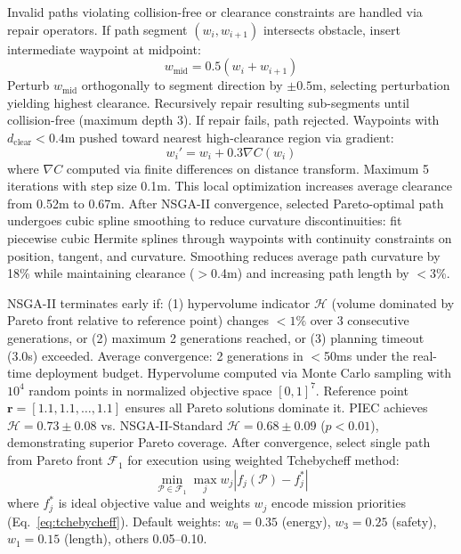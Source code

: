 \documentclass[pdflatex,sn-nature]{sn-jnl}%
\begin{document}
Invalid paths violating collision-free or clearance constraints are handled via repair operators. If path segment $(w_i, w_{i+1})$ intersects obstacle, insert intermediate waypoint at midpoint:
\begin{equation}
w_{\text{mid}} = 0.5(w_i + w_{i+1})
\label{eq:midpoint_repair}
\end{equation}
Perturb $w_{\text{mid}}$ orthogonally to segment direction by $\pm 0.5$m, selecting perturbation yielding highest clearance. Recursively repair resulting sub-segments until collision-free (maximum depth 3). If repair fails, path rejected. Waypoints with $d_{\text{clear}} < 0.4$m pushed toward nearest high-clearance region via gradient:
\begin{equation}
w_i' = w_i + 0.3 \nabla C(w_i)
\label{eq:gradient_repair}
\end{equation}
where $\nabla C$ computed via finite differences on distance transform. Maximum 5 iterations with step size 0.1m. This local optimization increases average clearance from 0.52m to 0.67m. After NSGA-II convergence, selected Pareto-optimal path undergoes cubic spline smoothing to reduce curvature discontinuities: fit piecewise cubic Hermite splines through waypoints with continuity constraints on position, tangent, and curvature. Smoothing reduces average path curvature by 18\% while maintaining clearance ($>$0.4m) and increasing path length by $<$3\%.

NSGA-II terminates early if: (1) hypervolume indicator $\mathcal{H}$ (volume dominated by Pareto front relative to reference point) changes $< 1\%$ over 3 consecutive generations, or (2) maximum 2 generations reached, or (3) planning timeout (3.0s) exceeded. Average convergence: 2 generations in $<$50ms under the real-time deployment budget. Hypervolume computed via Monte Carlo sampling with $10^4$ random points in normalized objective space $[0,1]^7$. Reference point $\mathbf{r} = [1.1, 1.1, \ldots, 1.1]$ ensures all Pareto solutions dominate it. PIEC achieves $\mathcal{H} = 0.73 \pm 0.08$ vs. NSGA-II-Standard $\mathcal{H} = 0.68 \pm 0.09$ ($p < 0.01$), demonstrating superior Pareto coverage. After convergence, select single path from Pareto front $\mathcal{F}_1$ for execution using weighted Tchebycheff method:
\begin{equation}
\min_{\mathcal{P} \in \mathcal{F}_1} \max_j w_j |f_j(\mathcal{P}) - f_j^*|
\label{eq:tchebycheff}
\end{equation}
where $f_j^*$ is ideal objective value and weights $w_j$ encode mission priorities (Eq.~\ref{eq:tchebycheff}). Default weights: $w_6 = 0.35$ (energy), $w_3 = 0.25$ (safety), $w_1 = 0.15$ (length), others 0.05--0.10.
\end{document}
